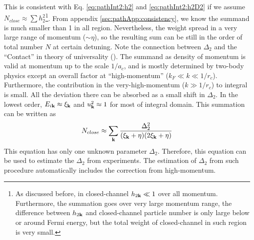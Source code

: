 This is consistent with Eq. \ref{eq:pathInt2:h2} and \ref{eq:pathInt2:h2D2} if we assume $N_{close}\approx\sum{h_{2}^{2}}$\footnote{As discussed before, in closed-channel $h_{2\mathbf{k}}\ll1$ over all momentum.  Furthermore, the summation goes over very large momentum range, the difference between $h_{2\mathbf{k}}$ and closed-channel particle number is only large below or around Fermi energy, but the total weight of closed-channel in such region is very small.  }.    From appendix \ref{sec:pathApp:consistency}, we know the summand is much smaller than 1 in all region.  Nevertheless, the weight spread in a very large range of momentum ($\sim\eta$), so the resulting sum can be still in the order of total number $N$ at certain detuning. Note the connection between $\Delta_{2}$ and the ``Contact'' in theory of universality (\cite{Tan2008-1,Tan2008-2}).  The summand as  density of momentum is valid at momentum up to the scale $1/a_{c}$, and is mostly determined by two-body physics except an overall factor at ``high-momentum'' ($k_{F}\ll{}k\ll{}1/r_{c}$).  Furthermore, the contribution in the very-high-momentum ($k\gg1/r_{c}$) to integral is small.  All the deviation there can be absorbed as a small shift in $\Delta_{2}$.  In the lowest order, $E_{i\mathbf{k}}\approx\xi_{\mathbf{k}}$ and $u_{\mathbf{k}}^2\approx1$ for most of integral domain.  This summation can be written as 
\begin{equation}\label{eq:pathInt2:closeD2}
N_{close}\approx\sum_{\mathbf{k}}\frac{\Delta_{2}^2}{(\xi_{\mathbf{k}}+\eta)(2\xi_{\mathbf{k}}+\eta)}
\end{equation}
This equation has only one unknown parameter $\Delta_{2}$.  Therefore, this equation can be used to estimate the $\Delta_{2}$ from experiments.  The  estimation of  $\Delta_{2}$ from such procedure automatically includes the correction from  high-momentum. 


